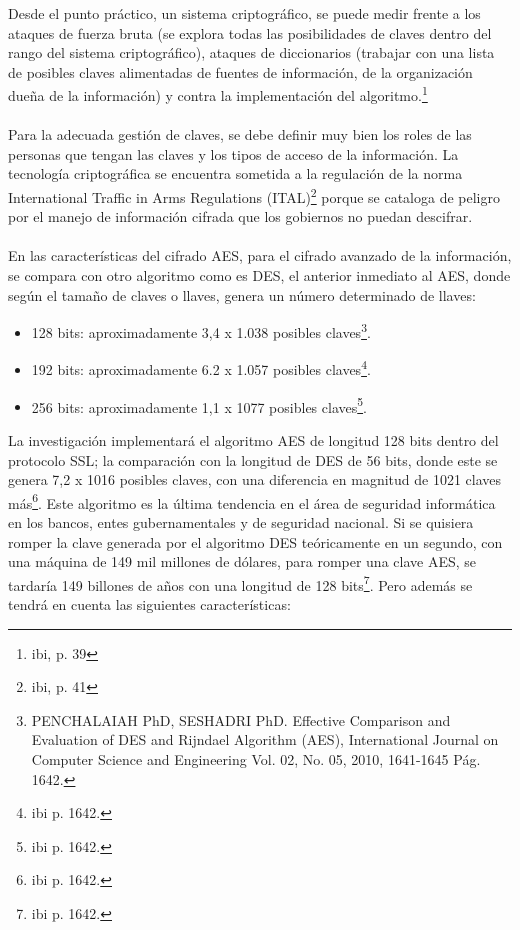 \documentclass[a4paper,openright,12pt]{book}
\theoremstyle{definition}
\theoremstyle{remark}
\begin{document}
Desde el punto práctico, un sistema criptográfico, se puede medir frente a los ataques de fuerza bruta (se explora todas las posibilidades de claves dentro del rango del sistema criptográfico),  ataques de diccionarios (trabajar con una lista de posibles claves alimentadas de fuentes de información, de la organización dueña de la información) y contra la implementación del algoritmo.\footnote{ibi, p. 39}\\\\
Para la adecuada gestión de claves, se debe definir muy bien los roles de las personas que tengan las claves y los tipos de acceso de la información. La tecnología criptográfica se encuentra sometida a la regulación de la norma International Traffic in Arms Regulations (ITAL)\footnote{ibi, p. 41} porque se cataloga de peligro por el manejo de información cifrada que los gobiernos no puedan descifrar.\\\\
En las características del cifrado AES, para el cifrado avanzado de la información, se compara con otro algoritmo como es DES, el anterior inmediato al AES, donde según el tamaño de claves o llaves, genera un número determinado de llaves:
\begin{itemize}
	\item 128 bits: aproximadamente 3,4 x 1.038 posibles claves\footnote{PENCHALAIAH PhD, SESHADRI  PhD. Effective Comparison and Evaluation of DES and Rijndael Algorithm (AES), International Journal on Computer Science and Engineering Vol. 02, No. 05, 2010, 1641-1645 Pág. 1642.}.
    \item 192 bits: aproximadamente 6.2 x 1.057 posibles claves\footnote{ibi p. 1642.}.
    \item 256 bits: aproximadamente 1,1 x 1077 posibles claves\footnote{ibi p. 1642.}.
\end{itemize}
La investigación implementará el algoritmo AES de longitud 128 bits dentro del protocolo SSL; la comparación con la longitud de DES de 56 bits, donde este se genera 7,2 x 1016 posibles claves, con una diferencia en magnitud de 1021 claves más\footnote{ibi p. 1642.}. Este algoritmo es la última tendencia en el área de seguridad informática en los bancos, entes gubernamentales y de seguridad nacional. Si se quisiera romper la clave generada por el algoritmo DES teóricamente en un segundo, con una máquina de 149 mil millones de dólares, para romper una clave AES, se tardaría 149 billones de años con una longitud de 128 bits\footnote{ibi p. 1642.}. Pero además se tendrá en cuenta las siguientes características:
\end{document}
